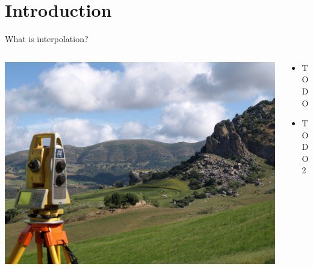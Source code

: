 
\section{Introduction}
\begin{frame}{What is interpolation?}
	\begin{columns}[T] %
		\begin{column}{.48\textwidth}
			\includegraphics[width=\linewidth]{images/background}
		\end{column}%
		\hfill%
		\begin{column}{.56\textwidth}
			\begin{itemize}
				\item TODO
				\item TODO 2
			\end{itemize}
		\end{column}%
	\end{columns}
\end{frame}
